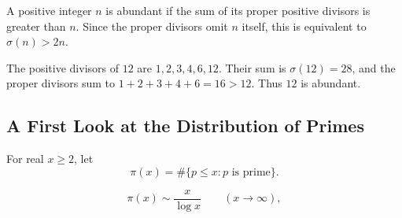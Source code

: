 \begin{definition}
A positive integer $n$ is abundant if the sum of its proper positive divisors is greater than $n$. Since the proper divisors omit $n$ itself, this is equivalent to $\sigma(n)>2n$.
\end{definition}

\begin{example}
The positive divisors of $12$ are $1,2,3,4,6,12$. Their sum is $\sigma(12)=28$, and the proper divisors sum to $1+2+3+4+6=16>12$. Thus $12$ is abundant.
\end{example}

\subsection{A First Look at the Distribution of Primes}

\begin{definition}
For real $x\geq2$, let
\[
 \pi(x)=\#\{p\leq x:p\text{ is prime}\}.
\]
\end{definition}

\begin{theorem}
\[
 \pi(x)\sim\frac{x}{\log x}\qquad(x\to\infty),
\]
\end{theorem}

